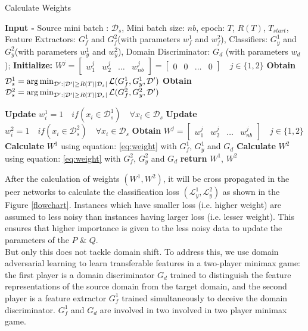 \begin{algorithm}[H]
	\caption{Calculate Weights}
	\begin{algorithmic}[1]
	    \State \textbf{Input -} Source mini batch : $\mathcal{D}_s$, Mini batch size: $nb$, epoch: $T$, $R(T)$, $T_{start}$,  Feature Extractors: $G_{f}^1$ and $G_{f}^2$(with parameters $w_{f}^1$ and $w_{f}^2$), Classifiers: $G_{y}^1$ and $G_{y}^2$(with parameters $w_{y}^1$ and $w_{y}^2$), Domain Discriminator: $G_d$ (with parameters $w_d$);
	    \State \textbf{Initialize:} $W^j = \begin{bmatrix} w_{1}^j & w_{2}^j & \dots & w_{nb}^j \end{bmatrix} =  \begin{bmatrix} 0 & 0 & \dots & 0 \end{bmatrix} \quad j \in \{1, 2\} $
		\State \textbf{Obtain} $\mathcal{D}_{s}^1 = \operatorname*{arg\,min}_{\mathcal{D}':|\mathcal{D}'|\geq R(T)|\mathcal{D}_{s}|} \mathcal{L}(G_{f}^1, G_{y}^1, \mathcal{D}')$ 
	    \State \textbf{Obtain} $\mathcal{D}_{s}^2 = \operatorname*{arg\,min}_{\mathcal{D}':|\mathcal{D}'|\geq R(T)|\mathcal{D}_{s}|} \mathcal{L}(G_{f}^2, G_{y}^2, \mathcal{D}')$
		
		\State \textbf{Update} $w_{i}^1 = 1 \quad if(x_i \in \mathcal{D}_{s}^1) \quad \forall x_i \in \mathcal{D}_s$
		\State \textbf{Update} $w_{i}^2 = 1 \quad if(x_i \in \mathcal{D}_{s}^2) \quad \forall x_i \in \mathcal{D}_s$
		\State \textbf{Obtain} $W^j = \begin{bmatrix} w_{1}^j & w_{2}^j & \dots & w_{nb}^j \end{bmatrix} \quad j \in \{1, 2\} $
		\EndIf
		\State \textbf{Calculate} $W^1$ using equation: \ref{eq:weight} with $G_{f}^1$, $G_{y}^1$ and $G_d$
		\State \textbf{Calculate} $W^2$ using equation: \ref{eq:weight} with $G_{f}^2$, $G_{y}^2$ and $G_d$
		\EndIf
		\State \textbf{return} $W^1$, $W^2$
	\end{algorithmic} 
\label{algo: cal_weight}
\end{algorithm}

After the calculation of weights $(W^1, W^2)$, it will be cross propagated in the peer networks to calculate the classification loss $(\mathcal{L}_{y}^1, \mathcal{L}_{y}^2)$ as shown in the Figure \ref{flowchart}. Instances which have smaller loss (i.e. higher weight) are assumed to less noisy than instances having larger loss (i.e. lesser weight). This ensures that higher importance is given to the less noisy data to update the parameters of the $P$ \& $Q$.\\
But only this does not tackle domain shift. To address this, we use domain adversarial learning\cite{dann} to learn transferable features in a two-player minimax game: the first player is a domain discriminator $G_d$ trained to distinguish the feature representations of the source domain from the target domain, and the second player is a feature extractor $G_{f}^1$ trained simultaneously to deceive the domain discriminator. $G_{f}^1$ and $G_d$ are involved in two involved in two player minimax game.

